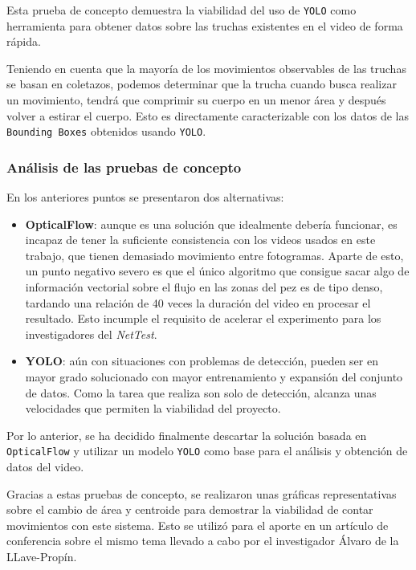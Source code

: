 Esta prueba de concepto demuestra la viabilidad del uso de \texttt{YOLO} como herramienta para obtener datos sobre las truchas existentes en el video de forma rápida.

Teniendo en cuenta que la mayoría de los movimientos observables de las truchas se basan en coletazos, podemos determinar que la trucha cuando busca realizar un movimiento, tendrá que comprimir su cuerpo en un menor 
área y después volver a estirar el cuerpo. Esto es directamente caracterizable con los datos de las \texttt{Bounding Boxes} obtenidos usando \texttt{YOLO}.

\vspace{2\baselineskip}

\subsubsection{Análisis de las pruebas de concepto}

En los anteriores puntos se presentaron dos alternativas:
\begin{itemize}
    \item \textbf{OpticalFlow}: aunque es una solución que idealmente debería funcionar, es incapaz de tener la suficiente consistencia con los videos usados en este trabajo, que tienen demasiado movimiento entre fotogramas. Aparte 
    de esto, un punto negativo severo es que el único algoritmo que consigue sacar algo de información vectorial sobre el flujo en las zonas del pez es de tipo denso, tardando una relación de 40 veces la duración del video en procesar 
    el resultado. Esto incumple el requisito de acelerar el experimento para los investigadores del \textit{NetTest}.
    \item \textbf{YOLO}: aún con situaciones con problemas de detección, pueden ser en mayor grado solucionado con mayor entrenamiento y expansión del conjunto de datos. Como la tarea que realiza son solo de detección, alcanza unas 
    velocidades que permiten la viabilidad del proyecto.
\end{itemize}

Por lo anterior, se ha decidido finalmente descartar la solución basada en \texttt{OpticalFlow} y utilizar un modelo \texttt{YOLO} como base para el análisis y obtención de datos del video. 

Gracias a estas pruebas de concepto, se realizaron unas gráficas representativas sobre el cambio de área y centroide para demostrar la viabilidad de contar movimientos con este sistema. Esto se utilizó para el 
aporte en un artículo de conferencia sobre el mismo tema llevado a cabo por el investigador Álvaro de la LLave-Propín\cite{delallave-propinEstilosAfrontamientoHacia2024}.

